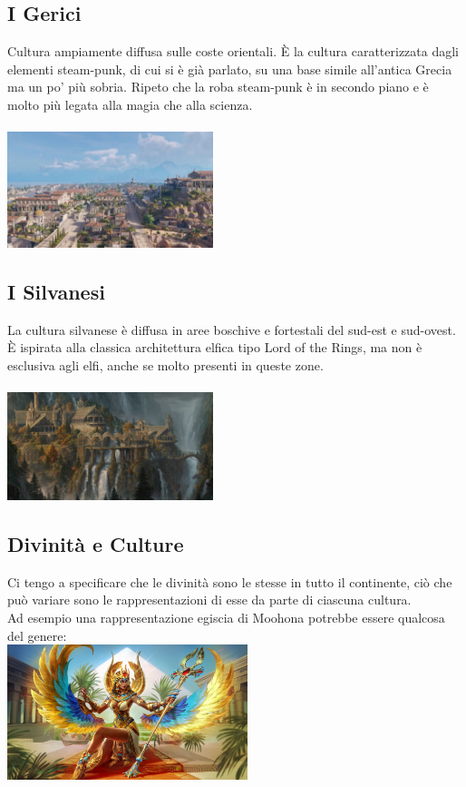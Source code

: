 \documentclass[10pt, a4paper]{report}
\begin{document}
\begin{multicols}{2}
\subsection*{I Gerici}
Cultura ampiamente diffusa sulle coste orientali. È la cultura caratterizzata dagli elementi steam-punk, di cui si è già parlato, su una base simile all'antica Grecia ma un po' più sobria. Ripeto che la roba steam-punk è in secondo piano e è molto più legata alla magia che alla scienza.\\
\\
\includegraphics[width=6cm]{gerici.jpg}	

\subsection*{I Silvanesi}
La cultura silvanese è diffusa in aree boschive e fortestali del sud-est e sud-ovest. È ispirata alla classica architettura elfica tipo Lord of the Rings, ma non è esclusiva agli elfi, anche se molto presenti in queste zone.\\
\\
\includegraphics[width=6cm]{silvanese.png}

\subsection*{Divinità e Culture}
Ci tengo a specificare che le divinità sono le stesse in tutto il continente, ciò che può variare sono le rappresentazioni di esse da parte di ciascuna cultura. \\
Ad esempio una rappresentazione egiscia di Moohona potrebbe essere qualcosa del genere:\\


\includegraphics[width=7cm]{moonaegisci.jpg}
\end{multicols}
\end{document}
